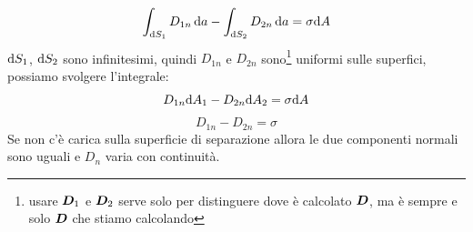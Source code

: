 \begin{equation}
\int_{\mathrm{d} S_1} D_{1n}\,\mathrm{d} a-\int_{\mathrm{d} S_2}D_{2n}\,\mathrm{d} a=\sigma\mathrm{d} A
\end{equation}
$\mathrm{d} S_1$, $\mathrm{d} S_2$ sono infinitesimi, quindi $D_{1n}$ e $D_{2n}$ sono\footnote{usare $\boldsymbol{D}_1$ e $\boldsymbol{D}_2$ serve solo per distinguere dove è calcolato $\boldsymbol{D}$, ma è sempre e solo $\boldsymbol{D}$ che stiamo calcolando} uniformi sulle superfici, possiamo svolgere l'integrale:
\begin{equation}
D_{1n}\mathrm{d} A_1-D_{2n}\mathrm{d} A_2=\sigma\mathrm{d} A
\end{equation}
\begin{equation}
D_{1n}-D_{2n}=\sigma
\label{D_normale02}
\end{equation}
Se non c'è carica sulla superficie di separazione allora le due componenti normali sono uguali e $D_n$ varia con continuità.
